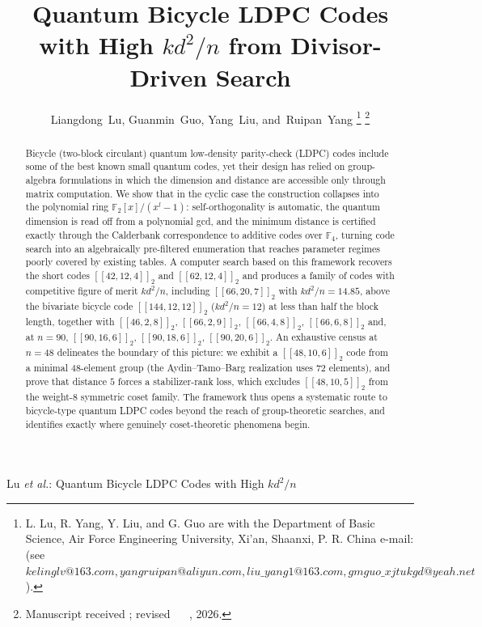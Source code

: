 \documentclass[journal,onecolumn]{IEEEtran}
\theoremstyle{definition}
\theoremstyle{remark}
\newcommand{\F}{\mathbb{F}}
\begin{document}
\title{Quantum Bicycle LDPC Codes with High $kd^2/n$ from
Divisor-Driven Search}
\author{Liangdong~Lu,
          Guanmin~Guo, Yang~Liu,
        and~Ruipan~Yang%
\thanks{L. Lu, R. Yang, Y. Liu, and G. Guo are with the Department of Basic Science, Air Force Engineering University, Xi'an, Shaanxi,  P. R. China e-mail: (see $kelinglv@163.com,yangruipan@aliyun.com, liu\_yang1@163.com, gmguo\_xjtukgd@yeah.net$).}%
\thanks{Manuscript received ; revised  ~ ~, 2026.}}
%
{Lu \MakeLowercase{\textit{et al.}}: Quantum Bicycle LDPC Codes with High $kd^2/n$}

\maketitle

\begin{abstract}
Bicycle (two-block circulant) quantum low-density parity-check (LDPC)
codes include some of the best known small quantum codes, yet their
design has relied on group-algebra formulations in which the dimension
and distance are accessible only through matrix computation. We show
that in the cyclic case the construction collapses into the polynomial
ring $\F_2[x]/(x^{l}-1)$: self-orthogonality is automatic, the quantum
dimension is read off from a polynomial gcd, and the minimum distance
is certified exactly through the Calderbank correspondence to additive
codes over $\F_4$, turning code search into an algebraically
pre-filtered enumeration that reaches parameter regimes poorly covered
by existing tables. A computer search based on this framework recovers the short codes
$[[42,12,4]]_2$ and $[[62,12,4]]_2$ and produces a family of codes with
competitive figure of merit $kd^2/n$, including $[[66,20,7]]_2$ with
$kd^2/n=14.85$, above the bivariate bicycle code $[[144,12,12]]_2$
($kd^2/n=12$) at less than half the block length, together with
$[[46,2,8]]_2$, $[[66,2,9]]_2$, $[[66,4,8]]_2$, $[[66,6,8]]_2$ and, at
$n=90$, $[[90,16,6]]_2$, $[[90,18,6]]_2$, $[[90,20,6]]_2$. An
exhaustive census at $n=48$ delineates the boundary of this picture:
we exhibit a $[[48,10,6]]_2$ code from a minimal $48$-element group
(the Aydin--Tamo--Barg realization uses $72$ elements), and prove that
distance $5$ forces a stabilizer-rank loss, which excludes
$[[48,10,5]]_2$ from the weight-$8$ symmetric coset family. The
framework thus opens a systematic route to bicycle-type quantum LDPC
codes beyond the reach of group-theoretic searches, and identifies
exactly where genuinely coset-theoretic phenomena begin.
\end{abstract}
\end{document}
